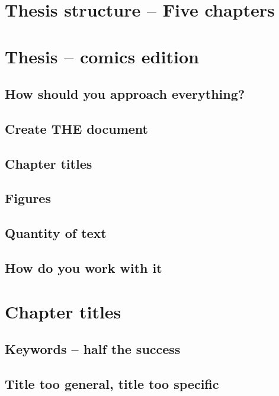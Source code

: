 \section{Thesis structure -- Five chapters}

\section{Thesis -- comics edition}

\subsection*{How should you approach everything?}

\subsection*{Create THE document}

\subsection*{Chapter titles}

\subsection*{Figures}

\subsection*{Quantity of text}

\subsection*{How do you work with it}

\section{Chapter titles}

\subsection*{Keywords -- half the success}

\subsection*{Title too general, title too specific}

